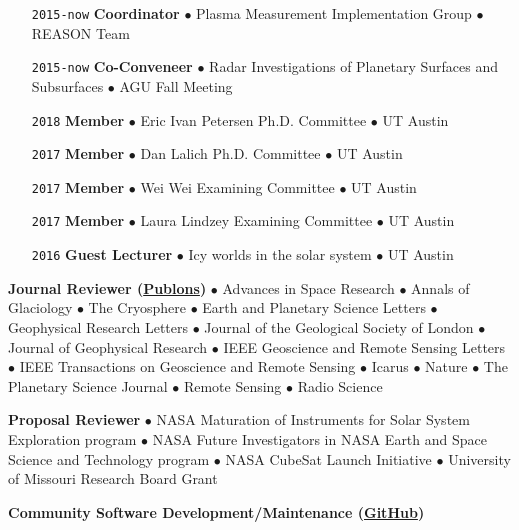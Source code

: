 \begin{itemize}[leftmargin=5.8em, labelsep=1.5em]
    \item[\texttt{2015-now}] \textbf{Coordinator} $\bullet$ Plasma Measurement Implementation Group $\bullet$ REASON Team
    \item[\texttt{2015-now}] \textbf{Co-Conveneer} $\bullet$  Radar Investigations of Planetary Surfaces and Subsurfaces $\bullet$ AGU Fall Meeting
    \item[\texttt{2018}] \textbf{Member} $\bullet$ Eric Ivan Petersen Ph.D. Committee $\bullet$ UT Austin
    \item[\texttt{2017}] \textbf{Member} $\bullet$ Dan Lalich Ph.D. Committee $\bullet$ UT Austin
    \item[\texttt{2017}] \textbf{Member} $\bullet$ Wei Wei Examining Committee $\bullet$ UT Austin
    \item[\texttt{2017}] \textbf{Member} $\bullet$ Laura Lindzey Examining Committee $\bullet$ UT Austin
    \item[\texttt{2016}] \textbf{Guest Lecturer} $\bullet$ Icy worlds in the solar system $\bullet$ UT Austin
\end{itemize}

\noindent\textbf{Journal Reviewer (\href{https://publons.com/author/1177202/cyril-grima\#profile}{Publons})}
$\bullet$ Advances in Space Research $\bullet$ Annals of Glaciology $\bullet$ The Cryosphere $\bullet$ Earth and Planetary Science Letters $\bullet$ Geophysical Research Letters $\bullet$ Journal of the Geological Society of London $\bullet$ Journal of Geophysical Research $\bullet$ IEEE Geoscience and Remote Sensing Letters $\bullet$ IEEE Transactions on Geoscience and Remote Sensing $\bullet$ Icarus $\bullet$ Nature $\bullet$ The Planetary Science Journal $\bullet$ Remote Sensing $\bullet$ Radio Science

\vspace{1em}
\noindent\textbf{Proposal Reviewer} $\bullet$
NASA Maturation of Instruments for Solar System Exploration program $\bullet$ NASA Future Investigators in NASA Earth and Space Science and Technology program $\bullet$ NASA CubeSat Launch Initiative $\bullet$ University of Missouri Research Board Grant

\vspace{1em}
\noindent\textbf{Community Software Development/Maintenance (\href{https://github.com/cgrima}{GitHub})}
\vspace{-.5em}


